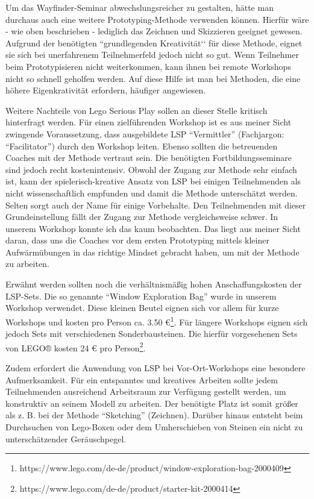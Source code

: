 Um das Wayfinder-Seminar abwechslungsreicher zu gestalten, hätte man durchaus auch eine weitere Prototyping-Methode verwenden können. Hierfür wäre - wie oben beschrieben - lediglich das Zeichnen und Skizzieren geeignet gewesen. Aufgrund der benötigten ``grundlegenden Kreativität‘‘ für diese Methode, eignet sie sich bei unerfahrenem Teilnehmerfeld jedoch nicht so gut. Wenn Teilnehmer beim Prototypisieren nicht weiterkommen, kann ihnen bei remote Workshops nicht so schnell geholfen werden. Auf diese Hilfe ist man bei Methoden, die eine höhere Eigenkrativität erfordern, häufiger angewiesen.

Weitere Nachteile von Lego Serious Play sollen an dieser Stelle kritisch hinterfragt werden. Für einen zielführenden Workshop ist es aus meiner Sicht zwingende Voraussetzung, dass ausgebildete LSP ``Vermittler'' (Fachjargon: ``Facilitator'') durch den Workshop leiten. Ebenso sollten die betreuenden Coaches mit der Methode vertraut sein. Die benötigten Fortbildungsseminare sind jedoch recht kostenintensiv. Obwohl der  Zugang zur Methode sehr einfach ist, kann der spielerisch-kreative Ansatz von LSP bei einigen Teilnehmenden als nicht wissenschaftlich empfunden und damit die Methode unterschätzt werden. Selten sorgt auch der Name für einige Vorbehalte. Den Teilnehmenden mit dieser Grundeinstellung fällt der Zugang zur Methode vergleichsweise schwer. In unserem Workshop konnte ich das kaum beobachten. Das liegt aus meiner Sicht daran, dass uns die Coaches vor dem ersten Prototyping mittels kleiner Aufwärmübungen in das richtige Mindset gebracht haben, um mit der Methode zu arbeiten.

Erwähnt werden sollten noch die verhältnismäßig hohen Anschaffungskosten der LSP-Sets. Die so genannte ``Window Exploration Bag'' wurde in unserem Workshop verwendet. Diese kleinen Beutel eignen sich vor allem für kurze Workshops und kosten pro Person ca. 3.50 €\footnote{https://www.lego.com/de-de/product/window-exploration-bag-2000409}. Für längere Workshops eignen sich jedoch Sets mit verschiedenen Sonderbausteinen. Die hierfür vorgesehenen Sets von LEGO® kosten 24 € pro Person\footnote{https://www.lego.com/de-de/product/starter-kit-2000414}. 

Zudem erfordert die Anwendung von LSP bei Vor-Ort-Workshops eine besondere Aufmerksamkeit. Für ein entspanntes und kreatives Arbeiten sollte jedem Teilnehmenden ausreichend Arbeitsraum zur Verfügung gestellt werden, um konstruktiv an seinem Modell zu arbeiten. Der benötigte Platz ist somit größer als z. B. bei der Methode ``Sketching'' (Zeichnen). Darüber hinaus entsteht beim Durchsuchen von Lego-Boxen oder dem Umherschieben von Steinen ein nicht zu unterschätzender Geräuschpegel.

